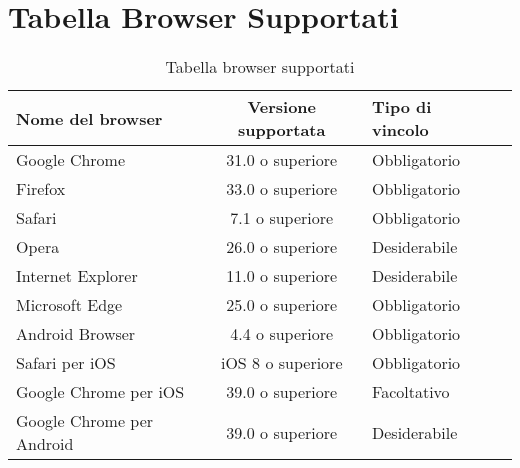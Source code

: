 \section{Tabella Browser Supportati}
\label{Tabella browser supportati}
\begin{table}[htbp]
	\begin{center}
		\setlength{\extrarowheight}{\jot}
		\begin{tabular}{|p{4cm}|c|p{2.5cm}|p{2.5cm}|}
			\hline
			\textbf{Nome del browser} & \textbf{Versione supportata} & \textbf{Tipo di vincolo}\\[1ex]
			\hline
			Google Chrome & 31.0 o superiore & Obbligatorio\\[1ex]
			\hline
			Firefox & 33.0 o superiore & Obbligatorio\\[1ex]
			\hline
			Safari & 7.1 o superiore & Obbligatorio\\[1ex]
			\hline
			Opera & 26.0 o superiore & Desiderabile\\[1ex]
			\hline
			Internet Explorer & 11.0 o superiore & Desiderabile \\[1ex]
			\hline
			Microsoft Edge & 25.0 o superiore & Obbligatorio \\[1ex]
			\hline
			Android Browser & 4.4 o superiore & Obbligatorio \\[1ex]
			\hline
			Safari per iOS & iOS 8 o superiore & Obbligatorio \\[1ex]
			\hline
			Google Chrome per iOS & 39.0 o superiore & Facoltativo\\[1ex]
			\hline
			Google Chrome per Android & 39.0 o superiore & Desiderabile\\[1ex]
			\hline
		\end{tabular}
	\end{center}
	\caption{Tabella browser supportati}
\end{table}
